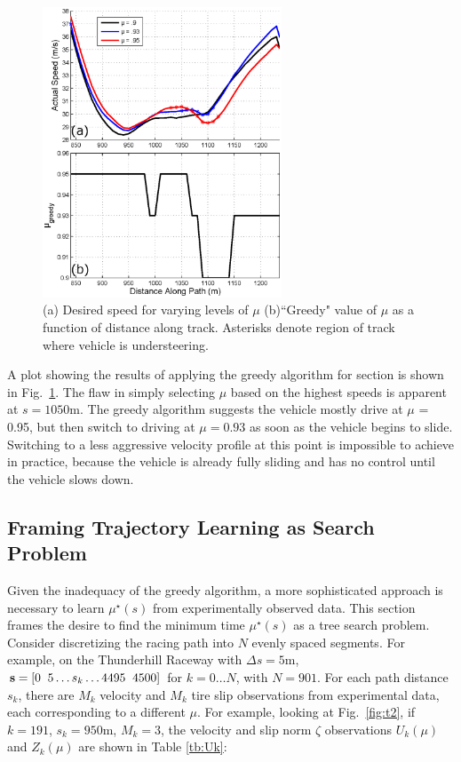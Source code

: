 \documentclass[9pt,shortpaper,twoside,web]{ieeecolor}
\newcommand*\circled[1]{\tikz[baseline=(char.base)]{
            \node[shape=circle,draw,inner sep=2pt] (char) {#1};}}
\begin{document}
 \begin{figure}[tb]
\centering
\includegraphics[width=2.8in]{figures/turn2greedy.eps}
\caption[Greedy algorithm results for region 2.]{(a) Desired speed for varying levels of $\mu$ (b)``Greedy" value of $\mu$ as a function of distance along track. Asterisks denote
region of track where vehicle is understeering.}
\label{fig:t2g}
\end{figure}

A plot showing the results of applying the greedy algorithm for section \circled{2} is shown in Fig.~\ref{fig:t2g}. The flaw in simply selecting $\mu$ based on the highest speeds is apparent at $s = 1050 \mathrm{m}$. The greedy algorithm suggests the vehicle mostly drive at $\mu$ = 0.95,
but then switch to driving at $\mu = 0.93$ as soon as the vehicle begins to slide. Switching to a less aggressive velocity profile at this point is impossible to achieve in practice, because the vehicle is already fully sliding and has no control until the vehicle slows down.


\subsection{Framing Trajectory Learning as Search Problem}
\label{sec:framingTL}

Given the inadequacy of the greedy algorithm, a more sophisticated approach is necessary to learn $\mu^\star(s)$ from
experimentally observed data. This section frames the desire to find the minimum time $\mu^\star(s)$ as a tree search problem.
Consider discretizing the racing path into $N$ evenly spaced segments. For example, on the Thunderhill Raceway with
$\Delta s = 5 \mathrm{m}$, $\textbf{s} = [0 \hspace{2mm} 5 \hdots s_k \hdots 4495 \hspace{2mm} 4500]$ for $k = 0 \hdots N$, with $N = 901$. For each
path distance $s_k$, there are $M_k$ velocity and $M_k$ tire slip observations from experimental data, each corresponding to a different $\mu$. 
For example, looking at Fig.~\ref{fig:t2}, if $k = 191$, $s_k =  950 \mathrm{m}$, $M_k = 3$, the velocity and slip norm $\zeta$ observations $U_k(\mu)$ and $Z_k(\mu)$ are shown in Table \ref{tb:Uk}:
\end{document}
